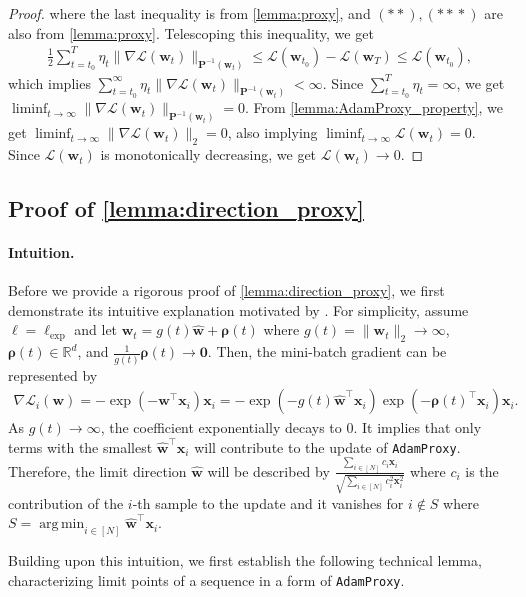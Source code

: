 \documentclass{article} %
\theoremstyle{plain}
\theoremstyle{definition}
\theoremstyle{remark}
\newcommand{\Ls}{\mathcal{L}}
\newcommand{\R}{\mathbb{R}}
\DeclareMathOperator*{\argmin}{arg\,min}
\def\bx{{\mathbf x}}
\def\bP{{\mathbf P}}
\def\bw{{\mathbf w}}
\begin{document}
\begin{proof}
    where the last inequality is from \cref{lemma:proxy}, and $(**), ({**}*)$ are also from \cref{lemma:proxy}. Telescoping this inequality, we get
    \begin{align*}
        \frac{1}{2} \sum_{t=t_0}^T \eta_t \|\nabla\Ls(\bw_t)\|_{\bP^{-1}(\bw_t)} \leq \Ls(\bw_{t_0}) - \Ls(\bw_T) \leq \Ls(\bw_{t_0}),
    \end{align*}
    which implies $\sum_{t=t_0}^\infty \eta_t \|\nabla\Ls(\bw_t)\|_{\bP^{-1}(\bw_t)} < \infty$. Since $\sum_{t=t_0}^T \eta_t = \infty$, we get $\liminf_{t \rightarrow \infty}\|\nabla\Ls(\bw_t)\|_{\bP^{-1}(\bw_t)}= 0$. From \cref{lemma:AdamProxy_property}, we get $\liminf_{t\rightarrow\infty} \|\nabla \Ls(\bw_t)\|_2=0$, also implying $\liminf_{t\rightarrow\infty} \Ls(\bw_t)=0$. Since $\Ls(\bw_t)$ is monotonically decreasing, we get $\Ls(\bw_t) \rightarrow 0$.
\end{proof}

\subsection[Proof of Lemma \ref{lemma:direction_proxy}]{Proof of \cref{lemma:direction_proxy}}
\paragraph{Intuition.}
Before we provide a rigorous proof of \cref{lemma:direction_proxy}, we first demonstrate its intuitive explanation motivated by \citet{soudry2018the}. For simplicity, assume $\ell=\ell_{\exp}$ and let $\bw_t = g(t)\hat{\bw}+\boldsymbol{\rho}(t)$ where $g(t)=\|\bw_t\|_2 \rightarrow \infty$, $\boldsymbol{\rho}(t) \in \R^d$, and $\frac{1}{g(t)}\boldsymbol{\rho}(t) \rightarrow \mathbf{0}$. Then, the mini-batch gradient can be represented by
\begin{align*}
    \nabla \Ls_i(\bw)=-\exp(-\bw^\top \bx_i)\bx_i = - \exp(-g(t)\hat{\bw}^\top \bx_i) \exp(-\boldsymbol{\rho}(t)^\top \bx_i)\bx_i.
\end{align*}
As $g(t) \rightarrow \infty$, the coefficient exponentially decays to 0. It implies that only terms with the smallest $\hat{\bw}^\top \bx_i$ will contribute to the update of \texttt{AdamProxy}. Therefore, the limit direction $\hat{\bw}$ will be described by $\frac{\sum_{i \in [N]}c_i \bx_i}{\sqrt{\sum_{i \in [N]}c_i^2 \bx_i^2}}$ where $c_i$ is the contribution of the $i$-th sample to the update and it vanishes for $i \notin S$ where $S=\argmin_{i \in [N]} \hat{\bw}^\top \bx_i$.

Building upon this intuition, we first establish the following technical lemma, characterizing limit points of a sequence in a form of \texttt{AdamProxy}.
\end{document}
